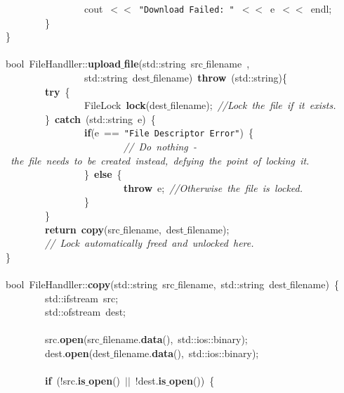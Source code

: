 \mbox{}\ \ \ \ \ \ \ \ \ \ \ \ \ \ \ \ cout\ $<$$<$\ \texttt{"{}Download\ Failed:\ "{}}\ $<$$<$\ e\ $<$$<$\ endl; \\
\mbox{}\ \ \ \ \ \ \ \ \} \\
\mbox{}\} \\
\mbox{} \\
\mbox{}bool\ FileHandller::\textbf{upload$\_$file}(std::string\ src$\_$filename\ , \\
\mbox{}\ \ \ \ \ \ \ \ \ \ \ \ \ \ \ \ std::string\ dest$\_$filename)\ \textbf{throw}\ (std::string)\{ \\
\mbox{}\ \ \ \ \ \ \ \ \textbf{try}\ \{ \\
\mbox{}\ \ \ \ \ \ \ \ \ \ \ \ \ \ \ \ FileLock\ \textbf{lock}(dest$\_$filename);\ \textit{//Lock\ the\ file\ if\ it\ exists.} \\
\mbox{}\ \ \ \ \ \ \ \ \}\ \textbf{catch}\ (std::string\ e)\ \{ \\
\mbox{}\ \ \ \ \ \ \ \ \ \ \ \ \ \ \ \ \textbf{if}(e\ ==\ \texttt{"{}File\ Descriptor\ Error"{}})\ \{ \\
\mbox{}\ \ \ \ \ \ \ \ \ \ \ \ \ \ \ \ \ \ \ \ \ \ \ \ \textit{//\ Do\ nothing\ -\ the\ file\ needs\ to\ be\ created\ instead,\ defying\ the\ point\ of\ locking\ it.} \\
\mbox{}\ \ \ \ \ \ \ \ \ \ \ \ \ \ \ \ \}\ \textbf{else}\ \{ \\
\mbox{}\ \ \ \ \ \ \ \ \ \ \ \ \ \ \ \ \ \ \ \ \ \ \ \ \textbf{throw}\ e;\ \textit{//Otherwise\ the\ file\ is\ locked.} \\
\mbox{}\ \ \ \ \ \ \ \ \ \ \ \ \ \ \ \ \} \\
\mbox{}\ \ \ \ \ \ \ \ \} \\
\mbox{}\ \ \ \ \ \ \ \ \textbf{return}\ \textbf{copy}(src$\_$filename,\ dest$\_$filename); \\
\mbox{}\ \ \ \ \ \ \ \ \textit{//\ Lock\ automatically\ freed\ and\ unlocked\ here.} \\
\mbox{}\} \\
\mbox{} \\
\mbox{}bool\ FileHandller::\textbf{copy}(std::string\ src$\_$filename,\ std::string\ dest$\_$filename)\ \{ \\
\mbox{}\ \ \ \ \ \ \ \ std::ifstream\ src; \\
\mbox{}\ \ \ \ \ \ \ \ std::ofstream\ dest; \\
\mbox{} \\
\mbox{}\ \ \ \ \ \ \ \ src.\textbf{open}(src$\_$filename.\textbf{data}(),\ std::ios::binary); \\
\mbox{}\ \ \ \ \ \ \ \ dest.\textbf{open}(dest$\_$filename.\textbf{data}(),\ std::ios::binary); \\
\mbox{} \\
\mbox{}\ \ \ \ \ \ \ \ \textbf{if}\ (!src.\textbf{is$\_$open}()\ $|$$|$\ !dest.\textbf{is$\_$open}())\ \{ \\

